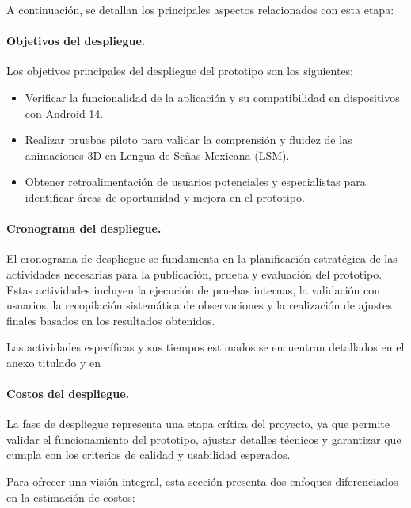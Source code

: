 A continuación, se detallan los principales aspectos relacionados con esta etapa:
\paragraph{\textbf{Objetivos del despliegue.}}
Los objetivos principales del despliegue del prototipo son los siguientes:

\begin{itemize}
	\item Verificar la funcionalidad de la aplicación y su compatibilidad en dispositivos con Android 14.
	\item Realizar pruebas piloto para validar la comprensión y fluidez de las animaciones 3D en Lengua de Señas Mexicana (LSM).
	\item Obtener retroalimentación de usuarios potenciales y especialistas para identificar áreas de oportunidad y mejora en el prototipo.
\end{itemize}

\paragraph{\textbf{Cronograma del despliegue.}}
El cronograma de despliegue se fundamenta en la planificación estratégica de las actividades necesarias para la publicación, prueba y evaluación del prototipo. Estas actividades incluyen la ejecución de pruebas internas, la validación con usuarios, la recopilación sistemática de observaciones y la realización de ajustes finales basados en los resultados obtenidos.


Las actividades específicas y sus tiempos estimados se encuentran detallados en el anexo titulado \textbf{} y en \textbf{}

\paragraph{\textbf{Costos del despliegue.}}
La fase de despliegue representa una etapa crítica del proyecto, ya que permite validar el funcionamiento del prototipo, ajustar detalles técnicos y garantizar que cumpla con los criterios de calidad y usabilidad esperados.

Para ofrecer una visión integral, esta sección presenta dos enfoques diferenciados en la estimación de costos:

